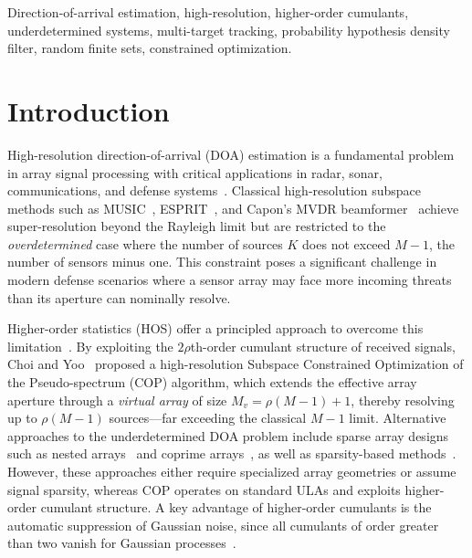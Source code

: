 \documentclass[journal]{IEEEtran}
\begin{document}
\begin{IEEEkeywords}
Direction-of-arrival estimation, high-resolution, higher-order cumulants, underdetermined systems, multi-target tracking, probability hypothesis density filter, random finite sets, constrained optimization.
\end{IEEEkeywords}

\section{Introduction}
\label{sec:intro}

High-resolution direction-of-arrival (DOA) estimation is a fundamental problem in array signal processing with critical applications in radar, sonar, communications, and defense systems~\cite{barshalom2011tracking,neri2018defense}. Classical high-resolution subspace methods such as MUSIC~\cite{schmidt1986music}, ESPRIT~\cite{roy1989esprit}, and Capon's MVDR beamformer~\cite{capon1969mvdr} achieve super-resolution beyond the Rayleigh limit but are restricted to the \emph{overdetermined} case where the number of sources $K$ does not exceed $M-1$, the number of sensors minus one. This constraint poses a significant challenge in modern defense scenarios where a sensor array may face more incoming threats than its aperture can nominally resolve.

Higher-order statistics (HOS) offer a principled approach to overcome this limitation~\cite{porat1991doa,chevalier2006hos}. By exploiting the $2\rho$th-order cumulant structure of received signals, Choi and Yoo~\cite{choi2015underdetermined} proposed a high-resolution Subspace Constrained Optimization of the Pseudo-spectrum (COP) algorithm, which extends the effective array aperture through a \emph{virtual array} of size $M_v = \rho(M-1)+1$, thereby resolving up to $\rho(M-1)$ sources---far exceeding the classical $M-1$ limit. Alternative approaches to the underdetermined DOA problem include sparse array designs such as nested arrays~\cite{pal2010nested} and coprime arrays~\cite{vaidyanathan2011coprime,liu2018superresolution,zhou2018deformed}, as well as sparsity-based methods~\cite{malioutov2005l1svd}. However, these approaches either require specialized array geometries or assume signal sparsity, whereas COP operates on standard ULAs and exploits higher-order cumulant structure. A key advantage of higher-order cumulants is the automatic suppression of Gaussian noise, since all cumulants of order greater than two vanish for Gaussian processes~\cite{mendel1991tutorial}.
\end{document}
